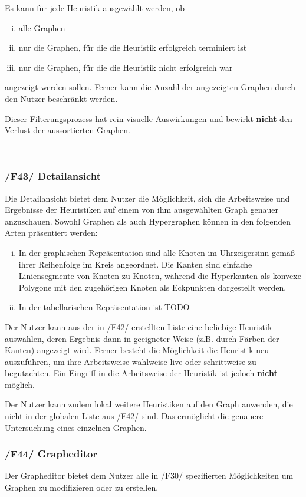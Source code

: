 \documentclass{article}
\begin{document}
	Es kann für jede Heuristik ausgewählt werden, ob
	\begin{enumerate}[i)]
		\item{alle Graphen}
		\item{nur die Graphen, für die die Heuristik erfolgreich terminiert ist}
		\item{nur die Graphen, für die die Heuristik nicht erfolgreich war}
	\end{enumerate}
	angezeigt werden sollen. Ferner kann die Anzahl der angezeigten Graphen durch den Nutzer beschränkt werden.
	
	Dieser Filterungsprozess hat rein visuelle Auswirkungen und bewirkt \textbf{nicht} den Verlust der aussortierten Graphen.
	
	~\newpage
	\subsubsection*{/F43/ Detailansicht} \label{f43} 
	
	Die Detailansicht bietet dem Nutzer die Möglichkeit, sich die Arbeitsweise und Ergebnisse der Heuristiken auf einem von ihm ausgewählten Graph genauer anzuschauen. Sowohl Graphen als auch Hypergraphen können in den folgenden Arten präsentiert werden:
	\begin{enumerate}[i)]
		\item{In der graphischen Repräsentation sind alle Knoten im Uhrzeigersinn gemäß ihrer Reihenfolge im Kreis angeordnet. Die Kanten sind einfache Liniensegmente von Knoten zu Knoten, während die Hyperkanten als konvexe Polygone mit den zugehörigen Knoten als Eckpunkten dargestellt werden.}
		\item{In der tabellarischen Repräsentation ist TODO}
	\end{enumerate}
	
	Der Nutzer kann aus der in /F42/ erstellten Liste eine beliebige Heuristik auswählen, deren Ergebnis dann in geeigneter Weise (z.B. durch Färben der Kanten) angezeigt wird. Ferner besteht die Möglichkeit die Heuristik neu auszuführen, um ihre Arbeitsweise wahlweise live oder schrittweise zu begutachten. Ein Eingriff in die Arbeitsweise der Heuristik ist jedoch \textbf{nicht} möglich.
	
	Der Nutzer kann zudem lokal weitere Heuristiken auf den Graph anwenden, die nicht in der globalen Liste aus /F42/ sind. Das ermöglicht die genauere Untersuchung eines einzelnen Graphen.
	
	\subsubsection*{/F44/ Grapheditor} \label{f44} 
	Der Grapheditor bietet dem Nutzer alle in /F30/ spezifierten Möglichkeiten um Graphen zu modifizieren oder zu erstellen.
	
\end{document}
